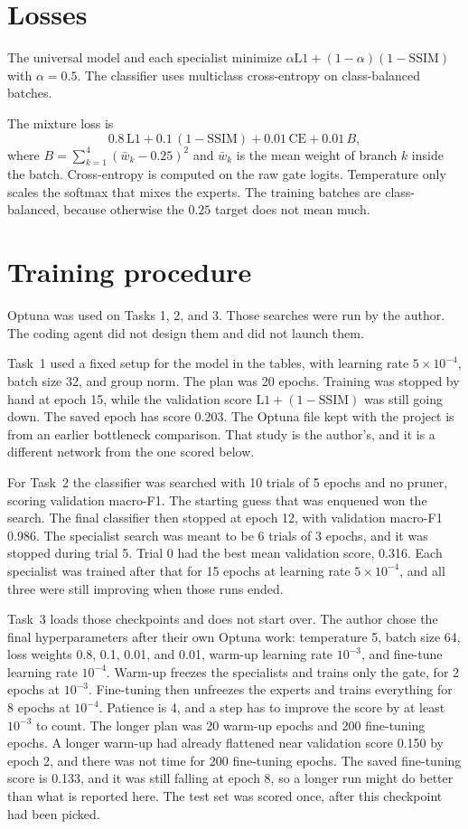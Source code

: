 \documentclass[conference]{IEEEtran}
\begin{document}
\section{Losses}
The universal model and each specialist minimize $\alpha \mathrm{L1} + (1-\alpha)(1-\mathrm{SSIM})$ with $\alpha=0.5$. The classifier uses multiclass cross-entropy on class-balanced batches.

The mixture loss is
\begin{equation}
0.8\,\mathrm{L1} + 0.1\,(1-\mathrm{SSIM}) + 0.01\,\mathrm{CE} + 0.01\,B,
\end{equation}
where $B=\sum_{k=1}^{4}(\bar{w}_k-0.25)^2$ and $\bar{w}_k$ is the mean weight of branch $k$ inside the batch. Cross-entropy is computed on the raw gate logits. Temperature only scales the softmax that mixes the experts. The training batches are class-balanced, because otherwise the $0.25$ target does not mean much.

\section{Training procedure}
Optuna was used on Tasks 1, 2, and 3. Those searches were run by the author. The coding agent did not design them and did not launch them.

Task~1 used a fixed setup for the model in the tables, with learning rate $5\times10^{-4}$, batch size 32, and group norm. The plan was 20 epochs. Training was stopped by hand at epoch 15, while the validation score $\mathrm{L1}+(1-\mathrm{SSIM})$ was still going down. The saved epoch has score 0.203. The Optuna file kept with the project is from an earlier bottleneck comparison. That study is the author's, and it is a different network from the one scored below.

For Task~2 the classifier was searched with 10 trials of 5 epochs and no pruner, scoring validation macro-F1. The starting guess that was enqueued won the search. The final classifier then stopped at epoch 12, with validation macro-F1 0.986. The specialist search was meant to be 6 trials of 3 epochs, and it was stopped during trial 5. Trial 0 had the best mean validation score, 0.316. Each specialist was trained after that for 15 epochs at learning rate $5\times10^{-4}$, and all three were still improving when those runs ended.

Task~3 loads those checkpoints and does not start over. The author chose the final hyperparameters after their own Optuna work: temperature 5, batch size 64, loss weights 0.8, 0.1, 0.01, and 0.01, warm-up learning rate $10^{-3}$, and fine-tune learning rate $10^{-4}$. Warm-up freezes the specialists and trains only the gate, for 2 epochs at $10^{-3}$. Fine-tuning then unfreezes the experts and trains everything for 8 epochs at $10^{-4}$. Patience is 4, and a step has to improve the score by at least $10^{-3}$ to count. The longer plan was 20 warm-up epochs and 200 fine-tuning epochs. A longer warm-up had already flattened near validation score 0.150 by epoch 2, and there was not time for 200 fine-tuning epochs. The saved fine-tuning score is 0.133, and it was still falling at epoch 8, so a longer run might do better than what is reported here. The test set was scored once, after this checkpoint had been picked.
\end{document}
